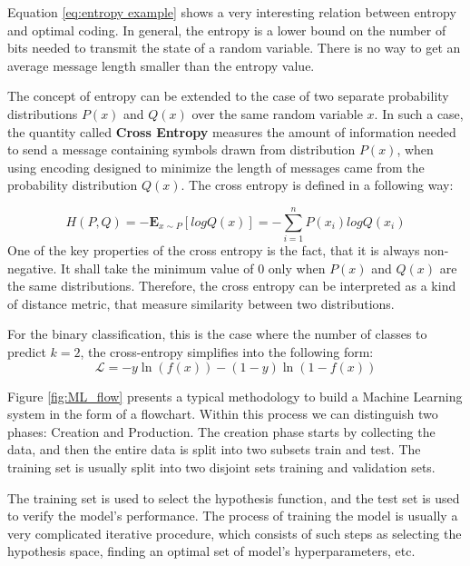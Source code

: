 Equation \ref{eq:entropy example} shows a very interesting relation between entropy and optimal coding. In general, the entropy is a lower bound on the number of bits needed to transmit the state of a random variable. There is no way to get an average message length smaller than the entropy value.   

The concept of entropy can be extended to the case of two separate probability distributions $P(x)$ and $Q(x)$ over the same random variable $x$.  In such a case, the quantity called \textbf{Cross Entropy}  measures the amount of information needed to send a message containing symbols drawn from distribution $P(x)$, when using encoding designed to minimize the length of messages came from the probability distribution $Q(x)$.  
The cross entropy is defined in a following way:

\begin{equation}
H(P,Q) = - \mathbf{E}_{x\sim P}[log Q(x)] = - \sum_{i=1}^{n} P(x_i)log Q(x_i)
\end{equation}
One of the key properties of the cross entropy is the fact, that it is always non-negative. It shall take the minimum value of $0$ only when $P(x)$  and $Q(x)$ are the same distributions.  Therefore, the cross entropy can be interpreted as a kind of distance metric, that measure similarity between two distributions. 

For the binary classification, this is the case where the number of classes to predict $k=2$, the cross-entropy simplifies into the following form:
\begin{equation}
\label{eq:CE_binary}
   \mathcal{L} = -y \ln\left( f(x) \right) - (1-y) \ln\left(1 -f(x) \right)
\end{equation}


Figure \ref{fig:ML_flow} presents a typical methodology to build a Machine Learning system in the form of a flowchart. 
Within this process we can distinguish two phases: Creation and Production. The creation phase starts by collecting the data, and then the entire data is split into two subsets train and test. The training set is usually split into two disjoint sets training and validation sets.

The training set is used to select the hypothesis function, and the test set is used to verify the model's performance.
The process of training the model is usually a very complicated iterative procedure, which consists of such steps as selecting the hypothesis space, finding an optimal set of model's hyperparameters, etc. 

